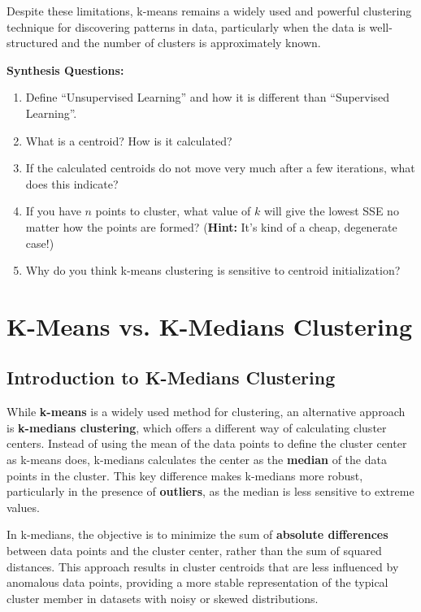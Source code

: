     Despite these limitations, k-means remains a widely used and powerful clustering technique for discovering patterns in data, particularly when the data is well-structured and the number of clusters is approximately known.

\begin{questionbox}
\textbf{Synthesis Questions:}
\begin{enumerate}
    \item Define ``Unsupervised Learning'' and how it is different than ``Supervised Learning''.
    \item What is a centroid? How is it calculated?
    \item If the calculated centroids do not move very much after a few iterations, what does this indicate?
    \item If you have $n$ points to cluster, what value of $k$ will give the lowest SSE no matter how the points are formed? (\textbf{Hint:} It's kind of a cheap, degenerate case!)
    \item Why do you think k-means clustering is sensitive to centroid initialization?
\end{enumerate}
\end{questionbox}

\section{K-Means vs. K-Medians Clustering}
\subsection{Introduction to K-Medians Clustering}
    \large While \textbf{k-means} is a widely used method for clustering, an alternative approach is \textbf{k-medians clustering}, which offers a different way of calculating cluster centers. Instead of using the mean of the data points to define the cluster center as k-means does, k-medians calculates the center as the \textbf{median} of the data points in the cluster. This key difference makes k-medians more robust, particularly in the presence of \textbf{outliers}, as the median is less sensitive to extreme values.
    
    In k-medians, the objective is to minimize the sum of \textbf{absolute differences} between data points and the cluster center, rather than the sum of squared distances. This approach results in cluster centroids that are less influenced by anomalous data points, providing a more stable representation of the typical cluster member in datasets with noisy or skewed distributions.

